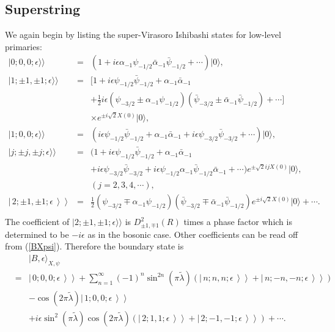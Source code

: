 \documentclass[a4paper,12pt]{article} \textheight=8.5truein
\newcommand{\dket}[1]{\left.\left|\, #1\,\right\rangle\right\rangle}
\newcommand{\tlambda}{\tilde{\lambda}}
\begin{document}
\subsection{Superstring}\label{superstring boundary}

We again begin by listing the super-Virasoro Ishibashi
states for low-level primaries:
\begin{eqnarray}
|0;0,0;\epsilon\rangle\rangle&=&
(1+i\epsilon\alpha_{-1}\psi_{-1/2}
\bar{\alpha}_{-1}\bar{\psi}_{-1/2}
+\cdots)|0\rangle ,\\
|1;\pm 1,\pm 1;\epsilon\rangle\rangle&=&
[1+i\epsilon\psi_{-1/2}\bar{\psi}_{-1/2}
+\alpha_{-1}\bar{\alpha}_{-1}\nonumber\\
&&+\frac{1}{2}i\epsilon(\psi_{-3/2}\pm\alpha_{-1}\psi_{-1/2})
(\bar{\psi}_{-3/2}\pm\bar{\alpha}_{-1}\bar{\psi}_{-1/2})+\cdots]\nonumber\\
&&\times e^{\pm i\sqrt{2}X(0)}|0\rangle ,\\
|1;0,0;\epsilon\rangle\rangle&=&(i\epsilon\psi_{-1/2}
\bar{\psi}_{-1/2}
+\alpha_{-1}\bar{\alpha}_{-1}+
i\epsilon\psi_{-3/2}\bar{\psi}_{-3/2}+
\cdots)|0\rangle,\\
|j;\pm j,\pm j;\epsilon\rangle\rangle &=&
(1+i\epsilon \psi_{-1/2}\bar{\psi}_{-1/2}
+\alpha_{-1}\bar{\alpha}_{-1}\nonumber\\
&&+i\epsilon\psi_{-3/2}\bar{\psi}_{-3/2}
+i\epsilon\psi_{-1/2}\alpha_{-1}
\bar{\psi}_{-1/2}\bar{\alpha}_{-1}
+\cdots)
e^{\pm \sqrt{2}i j X(0)}|0\rangle, \nonumber\\
&&(j=2,3,4,\cdots),\\
\dket{2;\pm 1,\pm 1;\epsilon}&=&\frac{1}{2}
(\psi_{-3/2}\mp\alpha_{-1}\psi_{-1/2})
(\bar{\psi}_{-3/2}\mp\bar{\alpha}_{-1}
\bar{\psi}_{-1/2}) e^{\pm i\sqrt{2}X(0)}|0\rangle+\cdots.
\nonumber\\
\end{eqnarray}
The coefficient of $|2;\pm 1,\pm 1;\epsilon\rangle\rangle$ is $D^2_{\pm 1,
\mp 1}(R)$ times a phase factor which is determined to be
$-i\epsilon$ as in the bosonic case. Other coefficients can be
read off from (\ref{BXpsi}). Therefore the boundary state is
\begin{eqnarray}
&&  |B,\epsilon\rangle_{X,\psi} \nonumber\\
&=&\dket{0;0,0;\epsilon}+\sum_{n=1}^\infty (-1)^n
\sin^{2n}(\pi\tlambda)\left(
\dket{n;n,n;\epsilon}+\dket{n;-n,-n;\epsilon} \right)\nonumber\\
&&-\cos(2\pi\tlambda)\dket{1;0,0;\epsilon}\nonumber\\
&&+i\epsilon\sin^2(\pi\tlambda)
\cos(2\pi\tlambda)(\dket{2;1,1;\epsilon}+\dket{2;-1,-1;\epsilon})+\cdots.
\end{eqnarray}
\end{document}
